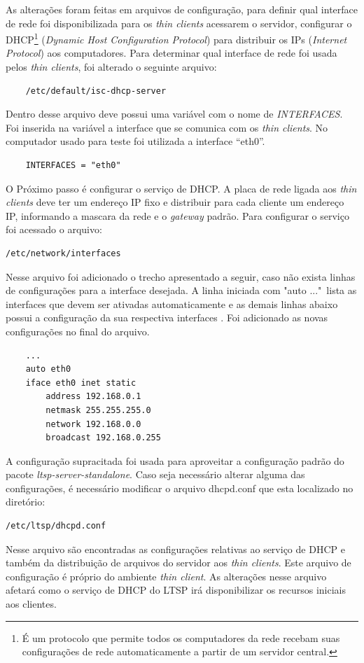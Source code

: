 \documentclass[
	12pt,				%
	openright,			%
	twoside,			%
	a4paper,			%
	chapter=TITLE,		%
	english,			%
	brazil				%
	]{abntex2}
\begin{document}
As alterações foram feitas em arquivos de configuração, para definir qual interface de rede foi disponibilizada para os \textit{thin clients} acessarem o servidor,  configurar o DHCP\footnote{É um protocolo que permite todos os computadores da rede recebam suas configurações de rede automaticamente a partir de um servidor central\cite{dhcp}.} (\textit{Dynamic Host Configuration Protocol}) para distribuir os IPs (\textit{Internet Protocol}) aos computadores. Para determinar qual interface de rede foi usada pelos \textit{thin clients}, foi alterado o seguinte arquivo:
\begin{verbatim}
	/etc/default/isc-dhcp-server
\end{verbatim}  
Dentro desse arquivo deve possui uma variável com o nome de \textit{INTERFACES}. Foi inserida na variável a interface que se comunica com os \textit{thin clients}. No computador usado para teste foi utilizada a interface “eth0”.
\begin{verbatim}
	INTERFACES = "eth0"
\end{verbatim}

O Próximo passo é configurar o serviço de DHCP. A placa de rede ligada aos \textit{thin clients} deve ter um endereço IP fixo e distribuir para cada cliente um endereço IP, informando a mascara da rede e o \textit{gateway} padrão. Para configurar o serviço foi acessado o arquivo: 
\begin{verbatim}
/etc/network/interfaces
\end{verbatim} 
Nesse arquivo foi adicionado o trecho apresentado a seguir, caso não exista linhas de configurações para a interface desejada. A linha iniciada com "auto ..."\ lista as interfaces que devem ser ativadas automaticamente e as demais linhas abaixo possui a configuração da sua respectiva interfaces \cite{ClubeHardware,LTSP5}. Foi adicionado as novas configurações no final do arquivo. 
\begin{verbatim}
	...
	auto eth0  
	iface eth0 inet static
		address 192.168.0.1
		netmask 255.255.255.0
		network 192.168.0.0
		broadcast 192.168.0.255
\end{verbatim}
A configuração supracitada foi usada para aproveitar a configuração padrão  do pacote \textit{ltsp-server-standalone}. Caso seja necessário alterar alguma das configurações, é necessário modificar o arquivo dhcpd.conf que esta localizado no diretório:
\begin{verbatim}
/etc/ltsp/dhcpd.conf
\end{verbatim}
Nesse arquivo são encontradas as configurações relativas ao serviço de DHCP e também da distribuição de arquivos do servidor aos \textit{thin clients}. Este arquivo de configuração é próprio do ambiente \textit{thin client}. As alterações nesse arquivo afetará como o  serviço de DHCP do LTSP irá disponibilizar os recursos iniciais aos clientes.
\end{document}
